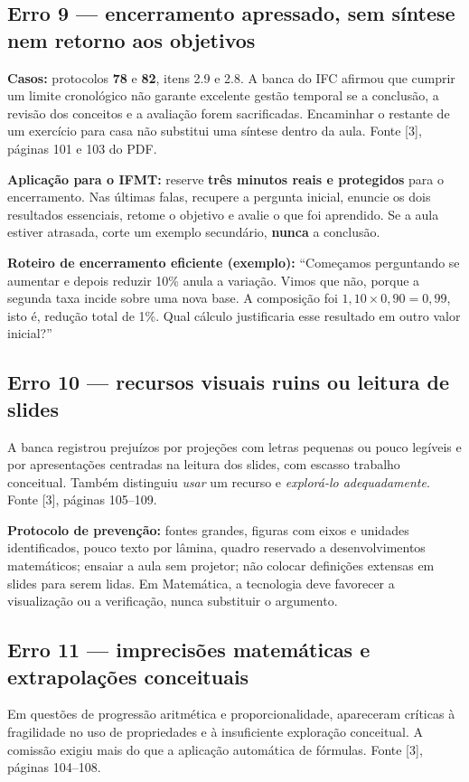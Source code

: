 \documentclass[11pt,a4paper]{article}
\begin{document}
\subsection{Erro 9 --- encerramento apressado, sem síntese nem retorno aos objetivos}
\textbf{Casos:} protocolos \textbf{78} e \textbf{82}, itens 2.9 e 2.8. A banca do IFC afirmou que cumprir um limite cronológico não garante excelente gestão temporal se a conclusão, a revisão dos conceitos e a avaliação forem sacrificadas. Encaminhar o restante de um exercício para casa não substitui uma síntese dentro da aula. Fonte [3], páginas 101 e 103 do PDF.

\textbf{Aplicação para o IFMT:} reserve \textbf{três minutos reais e protegidos} para o encerramento. Nas últimas falas, recupere a pergunta inicial, enuncie os dois resultados essenciais, retome o objetivo e avalie o que foi aprendido. Se a aula estiver atrasada, corte um exemplo secundário, \textbf{nunca} a conclusão.

\begin{destaque}
\textbf{Roteiro de encerramento eficiente (exemplo):} ``Começamos perguntando se aumentar e depois reduzir 10\% anula a variação. Vimos que não, porque a segunda taxa incide sobre uma nova base. A composição foi $1{,}10\times0{,}90=0{,}99$, isto é, redução total de 1\%. Qual cálculo justificaria esse resultado em outro valor inicial?''
\end{destaque}

\subsection{Erro 10 --- recursos visuais ruins ou leitura de slides}
A banca registrou prejuízos por projeções com letras pequenas ou pouco legíveis e por apresentações centradas na leitura dos slides, com escasso trabalho conceitual. Também distinguiu \textit{usar} um recurso e \textit{explorá-lo adequadamente}. Fonte [3], páginas 105--109.

\textbf{Protocolo de prevenção:} fontes grandes, figuras com eixos e unidades identificados, pouco texto por lâmina, quadro reservado a desenvolvimentos matemáticos; ensaiar a aula sem projetor; não colocar definições extensas em slides para serem lidas. Em Matemática, a tecnologia deve favorecer a visualização ou a verificação, nunca substituir o argumento.

\subsection{Erro 11 --- imprecisões matemáticas e extrapolações conceituais}
Em questões de progressão aritmética e proporcionalidade, apareceram críticas à fragilidade no uso de propriedades e à insuficiente exploração conceitual. A comissão exigiu mais do que a aplicação automática de fórmulas. Fonte [3], páginas 104--108.
\end{document}
